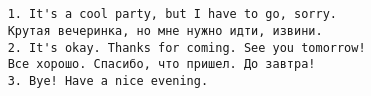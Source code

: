 \subsection*{}
\begin{verbatim}
    1. It's a cool party, but I have to go, sorry.
    Крутая вечеринка, но мне нужно идти, извини.
    2. It's okay. Thanks for coming. See you tomorrow!
    Все хорошо. Спасибо, что пришел. До завтра!
    3. Bye! Have a nice evening.
\end{verbatim}